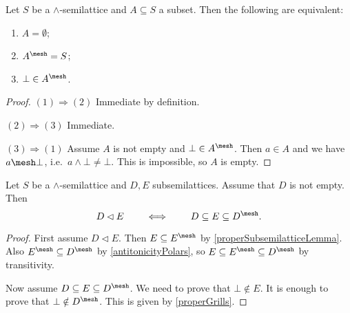 \begin{lemma} \label{properGrills}
Let $S$ be a $\wedge$-semilattice and $A\subseteq S$ a subset. Then the following are equivalent:
\begin{enumerate}
\item $A = \emptyset$;
\item $A^\mesh = S$;
\item $\bot \in A^\mesh$.
\end{enumerate}
\end{lemma}
\begin{proof}
$(1) \Rightarrow (2)$ Immediate by definition.

$(2) \Rightarrow (3)$ Immediate.

$(3) \Rightarrow (1)$ Assume $A$ is not empty and $\bot\in A^\mesh$. Then $a\in A$ and we have $a \mesh \bot$, i.e.\ $a\wedge \bot \neq \bot$. This is impossible, so $A$ is empty.
\end{proof}

\begin{proposition}
Let $S$ be a $\wedge$-semilattice and $D,E$ subsemilattices. Assume that $D$ is not empty. Then
\[ D \lhd E \qquad\iff\qquad D\subseteq E \subseteq D^\mesh. \]
\end{proposition}
\begin{proof}
First assume $D \lhd E$. Then $E\subseteq E^\mesh$ by \ref{properSubsemilatticeLemma}. Also $E^\mesh \subseteq D^\mesh$ by \ref{antitonicityPolars}, so $E\subseteq E^\mesh \subseteq D^\mesh$ by transitivity.

Now assume $D\subseteq E \subseteq D^\mesh$. We need to prove that $\bot\notin E$. It is enough to prove that $\bot \notin D^\mesh$. This is given by \ref{properGrills}.
\end{proof}


